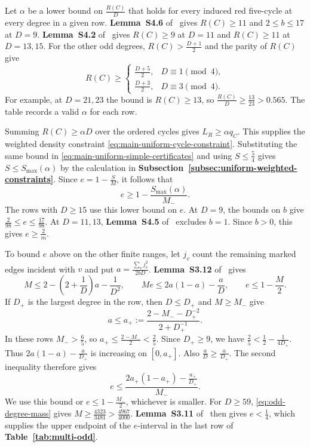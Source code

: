 \documentclass[preprint,11pt,numbers]{elsarticle-arxiv}
\numberwithin{equation}{section}
\theoremstyle{definition}
\begin{document}
Let $\alpha$ be a lower bound on $\frac{R(C)}{D}$ that holds
for every induced red five-cycle at every degree in a given row.
\textbf{Lemma~S4.6} of~\cite{FGSTSupplement} gives
$R(C)\geq11$ and $2\leq b\leq17$ at $D=9$.
\textbf{Lemma~S4.2} of~\cite{FGSTSupplement}
gives $R(C)\geq9$ at $D=11$ and $R(C)\geq11$ at $D=13,15$.
For the other odd degrees, $R(C)>\frac{D+1}{2}$ and the parity
of $R(C)$ give
\[
 R(C)\geq
 \begin{cases}
  \frac{D+5}{2},&D\equiv1\pmod4,\\
  \frac{D+3}{2},&D\equiv3\pmod4 .
 \end{cases}
\]
For example, at $D=21,23$ the bound is $R(C)\geq13$, so
$\frac{R(C)}{D}\geq\frac{13}{23}>0.565$. The table records a
valid $\alpha$ for each row.

Summing $R(C)\geq\alpha D$ over the ordered cycles gives
$L_R\geq\alpha q_C$. This supplies the weighted density constraint
\eqref{eq:main-uniform-cycle-constraint}. Substituting the same
bound in \eqref{eq:main-uniform-simple-certificates} and using
$S\leq\frac54$ gives $S\leq S_{\max}(\alpha)$ by the calculation
in \textbf{Subsection~\ref{subsec:uniform-weighted-constraints}}.
Since $e=1-\frac{S}{M}$, it follows that
\[
 e\geq 1-\frac{S_{\max}(\alpha)}{M_-}.
\]
The rows with $D\geq15$ use this lower bound on $e$. At $D=9$,
the bounds on $b$ give
$\frac{2}{98}\leq e\leq\frac{17}{98}$. At $D=11,13$,
\textbf{Lemma~S4.5} of~\cite{FGSTSupplement}
excludes $b=1$. Since $b>0$, this gives $e\geq\frac{2}{m}$.

To bound $e$ above on the other finite ranges, let $j_v$ count
the remaining marked edges incident with $v$ and put
$a=\frac{\sum_v j_v^2}{2bD}$. \textbf{Lemma~S3.12}
of~\cite{FGSTSupplement} gives
\[
 M\leq2-\left(2+\frac{1}{D}\right)a-\frac{1}{D^2},
 \qquad Me\leq2a(1-a)-\frac{a}{D},
 \qquad e\leq1-\frac{M}{2}.
\]
If $D_+$ is the largest degree in the row, then $D\leq D_+$
and $M\geq M_-$ give
\[
 a\leq a_+:=\frac{2-M_--D_+^{-2}}{2+D_+^{-1}}.
\]
In these rows $M_->\frac65$, so $a_+\leq\frac{2-M_-}{2}<\frac25$.
Since $D_+\geq9$, we have $\frac25<\frac12-\frac{1}{4D_+}$.
Thus $2a(1-a)-\frac{a}{D_+}$ is increasing on $[0,a_+]$.
Also $\frac{a}{D}\geq\frac{a}{D_+}$. The second inequality
therefore gives
\[
 e\leq\frac{2a_+(1-a_+)-\frac{a_+}{D_+}}{M_-}.
\]
We use this bound or $e\leq1-\frac{M_-}{2}$, whichever is
smaller. For $D\geq59$, \eqref{eq:odd-degree-mass} gives
$M\geq\frac{4323}{3481}>\frac{4967}{4000}$.
\textbf{Lemma~S3.11} of~\cite{FGSTSupplement} then gives $e<\frac{1}{4}$,
which supplies the upper endpoint of the $e$-interval in the last row
of \textbf{Table~\ref{tab:multi-odd}}.
\end{document}
